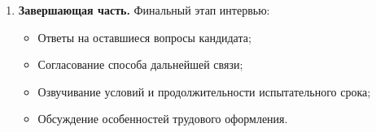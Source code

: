 \documentclass[14pt, russian]{matmex-diploma-custom}
\begin{document}
\begin{enumerate}
        \item \textbf{Завершающая часть.}
        Финальный этап интервью:
        \begin{itemize}
            \item Ответы на оставшиеся вопросы кандидата;
            \item Согласование способа дальнейшей связи;
            \item Озвучивание условий и продолжительности испытательного срока;
            \item Обсуждение особенностей трудового оформления.
        \end{itemize}
    \end{enumerate}

    
\end{document}
